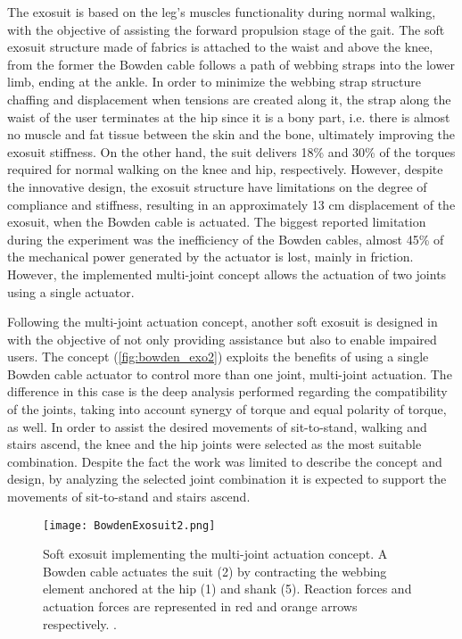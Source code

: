 The exosuit is based on the leg's muscles functionality during normal walking, with the objective of assisting the forward propulsion stage of the gait. The soft exosuit structure made of fabrics is attached to the waist and above the knee, from the former the Bowden cable follows a path of webbing straps into the lower limb, ending at the ankle. In order to minimize the webbing strap structure chaffing and displacement when tensions are created along it, the strap along the waist of the user terminates at the hip since it is a bony part, i.e. there is almost no muscle and fat tissue between the skin and the bone, ultimately improving the exosuit stiffness. On the other hand, the suit delivers 18\% and 30\% of the torques required for normal walking on the knee and hip, respectively. However, despite the innovative design, the exosuit structure have limitations on the degree of compliance and stiffness, resulting in an approximately 13 cm displacement of the exosuit, when the Bowden cable is actuated. The biggest reported limitation during the experiment was the inefficiency of the Bowden cables, almost 45\% of the mechanical power generated by the actuator is lost, mainly in friction. However, the implemented multi-joint concept allows the actuation of two joints using a single actuator.

Following the multi-joint actuation concept, another soft exosuit is designed in \cite{Bartenbach2015} with the objective of not only providing assistance but also to enable impaired users. The concept (\autoref{fig:bowden_exo2}) exploits the benefits of using a single Bowden cable actuator to control more than one joint, multi-joint actuation. The difference in this case is the deep analysis performed regarding the compatibility of the joints, taking into account synergy of torque and equal polarity of torque, as well. In order to assist the desired movements of sit-to-stand, walking and stairs ascend, the knee and the hip joints were selected as the most suitable combination. Despite the fact the work was limited to describe the concept and design, by analyzing the selected joint combination it is expected to support the movements of sit-to-stand and stairs ascend.
\begin{figure}[hbtp!]
    \centering
    \texttt{[image: BowdenExosuit2.png]}
    \caption{Soft exosuit implementing the multi-joint actuation concept. A Bowden cable actuates the suit (2) by contracting the webbing element anchored at the hip (1) and shank (5). Reaction forces and actuation forces are represented in red and orange arrows respectively. \cite{Bartenbach2015}. }
    \label{fig:bowden_exo2}
\end{figure}

